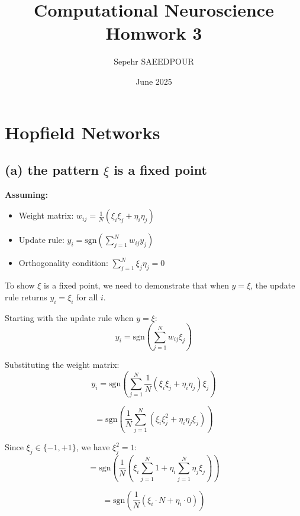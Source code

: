 \documentclass[11pt]{article}
\title{Computational Neuroscience Homwork 3}
\author{Sepehr SAEEDPOUR}
\date{June 2025}
\begin{document}
\maketitle

\section{Hopfield Networks}

\subsection*{(a) the pattern $\xi$ is a fixed point}

\textbf{Assuming:}
\begin{itemize}
    \item Weight matrix: $w_{ij} = \frac{1}{N}(\xi_i\xi_j + \eta_i\eta_j)$
    \item Update rule: $y_i = \text{sgn}\left(\sum_{j=1}^N w_{ij} y_j\right)$
    \item Orthogonality condition: $\sum_{j=1}^N \xi_j \eta_j = 0$
\end{itemize}

To show $\xi$ is a fixed point, we need to demonstrate that when $y = \xi$, the update rule returns $y_i = \xi_i$ for all $i$.

Starting with the update rule when $y = \xi$:
\begin{equation}
y_i = \text{sgn}\left(\sum_{j=1}^N w_{ij} \xi_j\right)
\end{equation}

Substituting the weight matrix:
\begin{equation}
y_i = \text{sgn}\left(\sum_{j=1}^N \frac{1}{N}(\xi_i\xi_j + \eta_i\eta_j) \xi_j\right)
\end{equation}

\begin{equation}
= \text{sgn}\left(\frac{1}{N}\sum_{j=1}^N (\xi_i\xi_j^2 + \eta_i\eta_j\xi_j)\right)
\end{equation}

Since $\xi_j \in \{-1, +1\}$, we have $\xi_j^2 = 1$:
\begin{equation}
= \text{sgn}\left(\frac{1}{N}\left(\xi_i\sum_{j=1}^N 1 + \eta_i\sum_{j=1}^N\eta_j\xi_j\right)\right)
\end{equation}

\begin{equation}
= \text{sgn}\left(\frac{1}{N}\left(\xi_i \cdot N + \eta_i \cdot 0\right)\right)
\end{equation}
\end{document}

